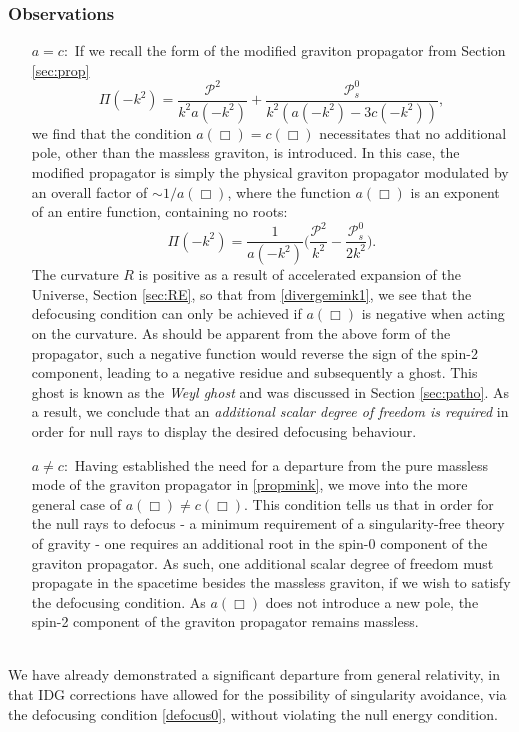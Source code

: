 \subsubsection*{Observations}
\begin{enumerate}
\item[$a=c:$] If we recall the form of the modified graviton propagator from Section \ref{sec:prop}
\[
\label{propmink}
\Pi(-k^{2})=\frac{\mathcal{P}^{2}}{k^{2}a(-k^{2})}+\frac{\mathcal{P}_{s}^{0}}{k^{2}\left(a(-k^{2})-3c(-k^{2})\right)},
\]  
we find that the condition $a(\Box)=c(\Box)$ necessitates that no additional pole, other than the massless graviton, is introduced. In this case, the modified propagator is simply the physical graviton propagator modulated by an overall factor of $\sim 1/a(\Box)$, where the function $a(\Box)$ is an exponent of an entire function, containing no roots:
\[
\label{defocus0}
\Pi(-k^{2})=\frac{1}{a(-k^{2})}\biggl(\frac{\mathcal{P}^{2}}{k^2}-\frac{\mathcal{P}_{s}^{0}}{2k^2}\biggr)
.\] 
The curvature $R$ is positive as a result of accelerated expansion of the Universe, Section \ref{sec:RE}, so that from \eqref{divergemink1}, we see that the defocusing condition can only be achieved if $a(\Box)$ is negative when acting on the curvature. As should be apparent from the above form of the propagator, such a negative function would reverse the sign of the spin-2 component, leading to a negative residue and subsequently a ghost. This ghost is known as the \emph{Weyl ghost} and was discussed in Section \ref{sec:patho}. As a result, we conclude that an \emph{additional scalar degree of freedom is required} in order for null rays to display the desired defocusing behaviour.  

\item[$a\neq c:$] Having established the  need for a departure from the pure massless mode of the graviton propagator
in \eqref{propmink}, we move into the more general case of $a(\Box)\neq c(\Box)$. This condition tells us that in order for the null rays to defocus - a minimum requirement of a singularity-free theory of gravity - one requires an additional root in the spin-0 component of the graviton propagator. As such, one additional scalar degree of freedom must propagate in the spacetime besides the massless graviton, if we wish to satisfy the defocusing condition.  As $a(\Box)$ does not introduce a new pole, the spin-2 component of the graviton
propagator remains massless. 
\end{enumerate}
~\\We have already demonstrated a significant departure from general relativity, in that IDG corrections have allowed for the possibility of singularity avoidance, via the defocusing condition \eqref{defocus0}, without violating the null energy condition. 

